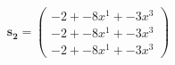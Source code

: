 \documentclass[preview]{standalone}
\begin{document}
\begin{align*}
\mathbf{s_2} = \begin{pmatrix}-2 + -8x^{1} + -3x^{3} \\ -2 + -8x^{1} + -3x^{3} \\ -2 + -8x^{1} + -3x^{3}\end{pmatrix}
\end{align*}
\end{document}
